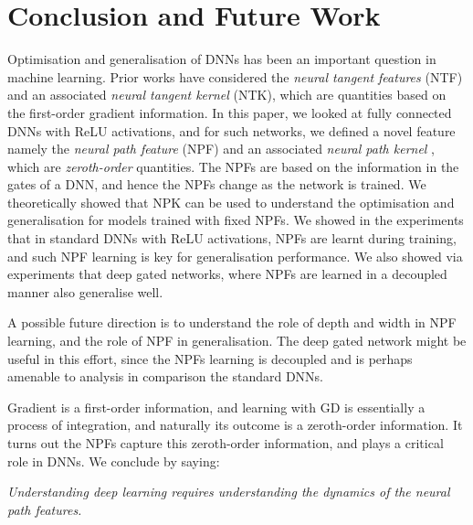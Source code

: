 \section{Conclusion and Future Work}
Optimisation and generalisation of DNNs has been an important question in machine learning. Prior works have considered the \emph{neural tangent features} (NTF) and an associated \emph{neural tangent kernel} (NTK), which are quantities based on the first-order gradient information.  In this paper, we looked at fully connected DNNs with ReLU activations, and for such networks, we defined a novel feature namely the \emph{neural path feature} (NPF) and an associated \emph{neural path kernel} , which are \emph{zeroth-order} quantities. The NPFs are based on the information in the gates of a DNN, and hence the NPFs change as the network is trained. We theoretically showed that NPK can be used to understand the optimisation and generalisation for models trained with fixed NPFs. We showed in the experiments that in standard DNNs with ReLU activations, NPFs are learnt during training, and such NPF learning is key for generalisation performance. We also showed via experiments that deep gated networks, where NPFs are learned in a decoupled manner also generalise well. 

A possible future direction is to understand the role of depth and width in NPF learning, and the role of NPF in generalisation. The deep gated network might be useful in this effort, since the NPFs learning is decoupled and is perhaps amenable to analysis in comparison the standard DNNs.

Gradient is a first-order information, and learning with GD is essentially a process of integration, and naturally its outcome is a zeroth-order information. It turns out the NPFs capture this zeroth-order information, and plays a critical role in DNNs. We conclude by saying: 

\emph{Understanding deep learning requires understanding the dynamics of the neural path features.}

